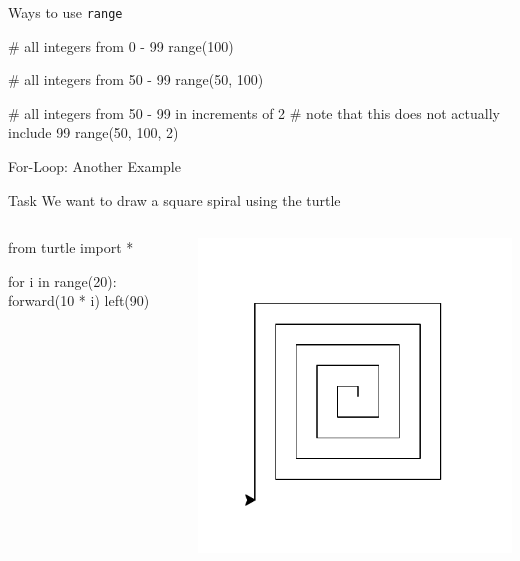 \begin{frame}[fragile]{Ways to use \texttt{range}}

    \begin{pythoncode}
    # all integers from 0 - 99
    range(100)

    # all integers from 50 - 99
    range(50, 100)

    # all integers from 50 - 99 in increments of 2
    # note that this does not actually include 99
    range(50, 100, 2)
    \end{pythoncode}

\end{frame}

\begin{frame}[fragile]{For-Loop: Another Example}

    \begin{block}{Task}
        We want to draw a square spiral using the turtle
    \end{block}

    \pause

    \begin{columns}[totalwidth=\textwidth]

    \begin{column}{0.5\textwidth}

    \vspace{-2em}

        \begin{pythoncode}
    from turtle import *

    for i in range(20):
        forward(10 * i)
        left(90)
        \end{pythoncode}

    \end{column}

    \begin{column}{0.5\textwidth}
        \includegraphics[width=\textwidth]{03_Control_Structures/spiral1}
    \end{column}


\end{columns}
\end{frame}

